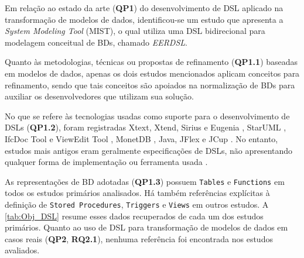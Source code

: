 Em relação ao estado da arte (\textbf{QP1}) do desenvolvimento de \ac{DSL} aplicado na transformação de modelos de dados, identificou-se um estudo que apresenta a \textit{System Modeling Tool} (MIST), o qual utiliza uma \ac{DSL} bidirecional para modelagem conceitual de \acp{BD}, chamado \textit{EERDSL}. 

Quanto às metodologias, técnicas ou propostas de refinamento (\textbf{QP1.1}) baseadas em modelos de dados, apenas os dois estudos mencionados aplicam conceitos para refinamento, sendo que tais conceitos são apoiados na normalização de \acp{BD} para auxiliar os desenvolvedores que utilizam sua solução.

No que se refere às tecnologias usadas como suporte para o desenvolvimento de \acp{DSL} (\textbf{QP1.2}), foram registradas Xtext, Xtend, Sirius e Eugenia \cite{Celikovic:2014, Dimitrieski:2015}, StarUML \cite{Ayadi:2016}, IfcDoc Tool e ViewEdit Tool \cite{Mazairac:2013}, MonetDB \cite {Kersten:2011}, Java, JFlex e JCup \cite{Tian:2006}. 
No entanto, estudos mais antigos eram geralmente especificações de \acp{DSL}, não apresentando qualquer forma de implementação ou ferramenta usada \cite{Shipman:1981, Jagannathan:1988, Litwin:1989}.

As representações de \ac{BD} adotadas (\textbf{QP1.3}) possuem \texttt{Tables} e \texttt{Functions} em todos os estudos primários analisados.
Há também referências explícitas à definição de \texttt{Stored Procedures}, \texttt{Triggers} e \texttt{Views} em outros estudos. 
A \autoref{tab:Obj_DSL} resume esses dados recuperados de cada um dos estudos primários. 
Quanto ao uso de \ac{DSL} para transformação de modelos de dados em casos reais (\textbf{QP2}, \textbf{RQ2.1}), nenhuma referência foi encontrada nos estudos avaliados.

